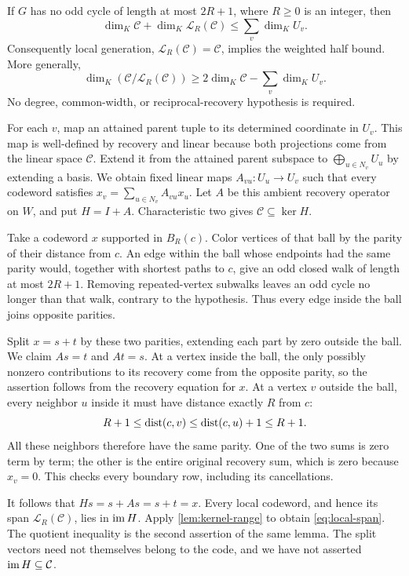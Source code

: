 \begin{theorem}
\label{thm:local-generation}
\notformalized
If $G$ has no odd cycle of length at most $2R+1$, where $R\ge0$
is an integer, then
\begin{equation}\label{eq:local-span}
 \dim_K\mathcal C+\dim_K\mathcal L_R(\mathcal C)
       \le\sum_v\dim_K U_v.
\end{equation}
Consequently local generation, $\mathcal L_R(\mathcal C)=\mathcal C$,
implies the weighted half bound. More generally,
\[
 \dim_K(\mathcal C/\mathcal L_R(\mathcal C))
       \ge2\dim_K\mathcal C-\sum_v\dim_K U_v.
\]
No degree, common-width, or reciprocal-recovery hypothesis is required.
\end{theorem}
\begin{informalproof}
For each $v$, map an attained parent tuple to its determined coordinate
in $U_v$. This map is well-defined by recovery and linear because
both projections come from the linear space $\mathcal C$.
Extend it from the attained parent subspace to
$\bigoplus_{u\in N_v}U_u$ by extending a basis. We obtain fixed
linear maps $A_{vu}:U_u\to U_v$ such that every codeword satisfies
$x_v=\sum_{u\in N_v}A_{vu}x_u$.
Let $A$ be this ambient recovery operator on $W$, and put $H=I+A$.
Characteristic two gives $\mathcal C\subseteq\ker H$.

Take a codeword $x$ supported in $B_R(c)$. Color vertices of that
ball by the parity of their distance from $c$. An edge within the
ball whose endpoints had the same parity would, together with
shortest paths to $c$, give an odd closed walk of length at most
$2R+1$. Removing repeated-vertex subwalks leaves an odd cycle no
longer than that walk, contrary to the hypothesis. Thus every
edge inside the ball joins opposite parities.

Split $x=s+t$ by these two parities, extending each part by zero
outside the ball. We claim $As=t$ and $At=s$. At a vertex inside
the ball, the only possibly nonzero contributions to its recovery
come from the opposite parity, so the assertion follows from the
recovery equation for $x$. At a vertex $v$ outside the ball, every
neighbor $u$ inside it must have distance exactly $R$ from $c$:
\[
 R+1\le\operatorname{dist}(c,v)\le\operatorname{dist}(c,u)+1\le R+1.
\]
All these neighbors therefore have the same parity. One of the
two sums is zero term by term; the other is the entire original
recovery sum, which is zero because $x_v=0$. This checks every
boundary row, including its cancellations.

It follows that $Hs=s+As=s+t=x$. Every local codeword, and hence
its span $\mathcal L_R(\mathcal C)$, lies in $\operatorname{im} H$.
Apply \cref{lem:kernel-range} to obtain \eqref{eq:local-span}.
The quotient inequality is the second assertion of the same lemma.
The split vectors need not themselves belong to the code, and we
have not asserted $\operatorname{im} H\subseteq\mathcal C$.
\end{informalproof}

